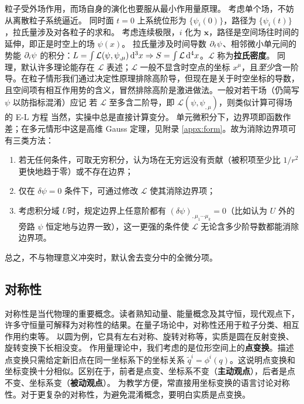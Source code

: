 粒子受外场作用，而场自身的演化也要服从最小作用量原理。
考虑单个场，不妨从离散粒子系统逼近。
同时面 $t=0$ 上系统位形为 $\{\psi_i(0)\}$，路径为 $\{\psi_i(t)\}$，拉氏量涉及对各粒子的求和。
考虑连续极限，$i$ 化为 $\bm x$，路径是空间场往时间的延伸，即正是时空上的场 $\psi(x)$。
拉氏量涉及时间导数 $\partial_t\psi$、相邻微小单元间的势能 $\partial_i\psi$ 的积分：$L=\int\mathcal L(\psi,\psi_{,\mu})\dd[3]{x}\Rightarrow S=\int \mathcal L \dd[4]{x}$。$\mathcal L$ 称为\textbf{拉氏密度}。
同理，默认许多理论能存在 $\mathcal L$ 表述；$\mathcal L$ 一般不显含时空点的坐标 $x^\mu$，且\textit{至少}含一阶导。在粒子情形我们通过决定性原理排除高阶导，但现在是关于时空坐标的导数，且空间项有相互作用势的含义，冒然排除高阶是激进做法。一般对若干场（仍简写 $\psi$ 以防指标混淆）应记
若 $\mathcal L$ 至多含二阶导，即 $\mathcal L(\psi,\psi_{,\mu})$，则类似计算可得场的 E-L 方程
当然，实操中总是直接计算变分。
单元微积分下，边界项即函数作差；在多元情形中这是高维 Gauss 定理，见附录 \ref{appx:form}。故为消除边界项可有三类方法：
\begin{enumerate}
    \item 若无任何条件，可取无穷积分，认为场在无穷远没有贡献（被积项至少比 $1/r^2$ 更快地趋于零）或不存在边界；
    \item 仅在 $\delta \psi=0$ 条件下，可通过修改 $\mathcal L$ 使其消除边界项；
    \item 考虑积分域 $U$时，规定边界上任意阶都有 $(\delta \psi)_{,\mu_1\cdots\mu_k}=0$（比如认为 $U$ 外的旁路 $\psi$ 恒定地与边界一致），这一更强的条件使 $\mathcal L$ 无论含多少阶导数都能消除边界项。
\end{enumerate}
总之，不与物理意义冲突时，默认舍去变分中的全微分项。

\subsection{对称性}

对称性是当代物理的重要概念。读者熟知动量、能量概念及其守恒，现代观点下，许多守恒量可解释为对称性的结果。在量子场论中，对称性还用于粒子分类、相互作用约束等。
以圆为例，它具有左右对称、旋转对称等，实质是圆在反射变换、旋转变换下长相没变。
作用量理论中，我们考虑的是位形空间上的\textbf{点变换}。描述点变换只需给定新旧点在同一坐标系下的坐标关系 $\tilde{q}^i=\phi^i(q)$。这说明点变换和坐标变换十分相似。区别在于，前者是点变、坐标系不变（\textbf{主动观点}），后者是点不变、坐标系变（\textbf{被动观点}）。
为教学方便，常直接用坐标变换的语言讨论对称性。对于更复杂的对称性，为避免混淆概念，要明白实质是点变换。

